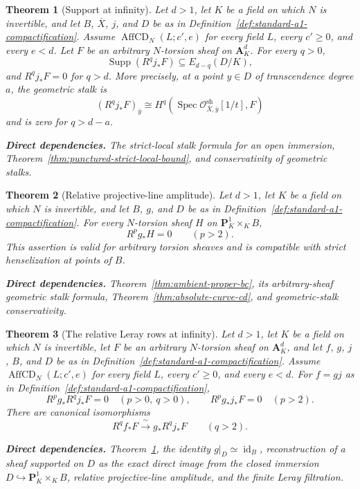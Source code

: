 \documentclass[10pt]{article}
\newtheorem{theorem}{Theorem}[section]
\theoremstyle{definition}
\newcommand{\Spec}{\operatorname{Spec}}
\newcommand{\deps}[1]{\par\smallskip\noindent\textbf{Direct dependencies.} #1}
\begin{document}
\begin{theorem}[Support at infinity]
\label{thm:open-higher-support}
Let $d>1$, let $K$ be a field on which $N$ is invertible, and let
$B$, $\overline X$, $j$, and $D$ be as in
Definition~\ref{def:standard-a1-compactification}.  Assume
$\operatorname{AffCD}_N(L;c',e)$ for every field $L$, every $c'\geq0$, and
every $e<d$.  Let $F$ be an arbitrary $N$-torsion sheaf on
$\mathbf A^d_K$.  For every $q>0$,
\[
 \operatorname{Supp}(R^qj_*F)\subseteq E_{d-q}(D/K),
\]
and $R^qj_*F=0$ for $q>d$.  More precisely, at a point
$y\in D$ of transcendence degree $a$, the geometric stalk is
\[
 (R^qj_*F)_{\bar y}
 \cong H^q(\Spec\mathcal O^{\mathrm{sh}}_{\overline X,\bar y}[1/t],F)
\]
and is zero for $q>d-a$.
\deps{The strict-local stalk formula for an open immersion,
Theorem~\ref{thm:punctured-strict-local-bound}, and conservativity of
geometric stalks.}
\end{theorem}

\begin{theorem}[Relative projective-line amplitude]
\label{thm:relative-p1-cd}
Let $d>1$, let $K$ be a field on which $N$ is invertible, and let
$B$, $g$, and $D$ be as in
Definition~\ref{def:standard-a1-compactification}.
For every $N$-torsion sheaf $H$ on
$\mathbf P^1_K\times_KB$,
\[
 R^pg_*H=0\qquad(p>2).
\]
This assertion is valid for arbitrary torsion sheaves and is compatible with
strict henselization at points of $B$.
\deps{Theorem~\ref{thm:ambient-proper-bc}, its arbitrary-sheaf geometric
stalk formula, Theorem~\ref{thm:absolute-curve-cd}, and geometric-stalk
conservativity.}
\end{theorem}

\begin{theorem}[The relative Leray rows at infinity]
\label{thm:a1-relative-rows}
Let $d>1$, let $K$ be a field on which $N$ is invertible, let $F$ be an
arbitrary $N$-torsion sheaf on $\mathbf A^d_K$, and let $f$, $g$, $j$, $B$,
and $D$ be as in Definition~\ref{def:standard-a1-compactification}.
Assume $\operatorname{AffCD}_N(L;c',e)$ for every field $L$, every
$c'\geq0$, and every $e<d$.
For $f=gj$ as in Definition~\ref{def:standard-a1-compactification},
\[
 R^pg_*R^qj_*F=0\quad(p>0,\ q>0),
 \qquad
 R^pg_*j_*F=0\quad(p>2).
\]
There are canonical isomorphisms
\[
 R^qf_*F\xrightarrow{\ \sim\ }g_*R^qj_*F\qquad(q>2).
\]
\deps{Theorem~\ref{thm:open-higher-support}, the identity $g|_D\simeq
\operatorname{id}_B$, reconstruction of a sheaf supported on $D$ as the
exact direct image from the closed immersion $D\hookrightarrow
\mathbf P^1_K\times_KB$, relative projective-line amplitude, and the finite
Leray filtration.}
\end{theorem}
\end{document}
